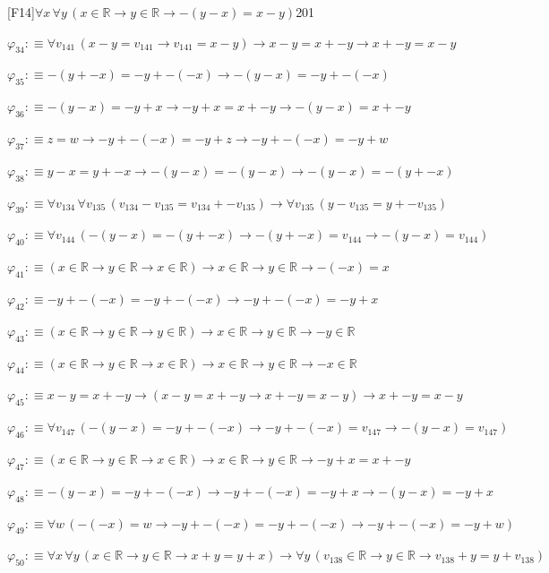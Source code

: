 \begin{fullproof}{[F14]}{$\forall x\,\forall y\,(x \in \mathbb{R} \to y \in \mathbb{R} \to -(y - x) = x - y)$}{201}
\begin{abbrevlist}
\item $\varphi_{34} :\equiv \forall v_{141}\,(x - y = v_{141} \to v_{141} = x - y) \to x - y = x + -y \to x + -y = x - y$
\item $\varphi_{35} :\equiv -(y + -x) = -y + -(-x) \to -(y - x) = -y + -(-x)$
\item $\varphi_{36} :\equiv -(y - x) = -y + x \to -y + x = x + -y \to -(y - x) = x + -y$
\item $\varphi_{37} :\equiv z = w \to -y + -(-x) = -y + z \to -y + -(-x) = -y + w$
\item $\varphi_{38} :\equiv y - x = y + -x \to -(y - x) = -(y - x) \to -(y - x) = -(y + -x)$
\item $\varphi_{39} :\equiv \forall v_{134}\,\forall v_{135}\,(v_{134} - v_{135} = v_{134} + -v_{135}) \to \forall v_{135}\,(y - v_{135} = y + -v_{135})$
\item $\varphi_{40} :\equiv \forall v_{144}\,(-(y - x) = -(y + -x) \to -(y + -x) = v_{144} \to -(y - x) = v_{144})$
\item $\varphi_{41} :\equiv (x \in \mathbb{R} \to y \in \mathbb{R} \to x \in \mathbb{R}) \to x \in \mathbb{R} \to y \in \mathbb{R} \to -(-x) = x$
\item $\varphi_{42} :\equiv -y + -(-x) = -y + -(-x) \to -y + -(-x) = -y + x$
\item $\varphi_{43} :\equiv (x \in \mathbb{R} \to y \in \mathbb{R} \to y \in \mathbb{R}) \to x \in \mathbb{R} \to y \in \mathbb{R} \to -y \in \mathbb{R}$
\item $\varphi_{44} :\equiv (x \in \mathbb{R} \to y \in \mathbb{R} \to x \in \mathbb{R}) \to x \in \mathbb{R} \to y \in \mathbb{R} \to -x \in \mathbb{R}$
\item $\varphi_{45} :\equiv x - y = x + -y \to (x - y = x + -y \to x + -y = x - y) \to x + -y = x - y$
\item $\varphi_{46} :\equiv \forall v_{147}\,(-(y - x) = -y + -(-x) \to -y + -(-x) = v_{147} \to -(y - x) = v_{147})$
\item $\varphi_{47} :\equiv (x \in \mathbb{R} \to y \in \mathbb{R} \to x \in \mathbb{R}) \to x \in \mathbb{R} \to y \in \mathbb{R} \to -y + x = x + -y$
\item $\varphi_{48} :\equiv -(y - x) = -y + -(-x) \to -y + -(-x) = -y + x \to -(y - x) = -y + x$
\item $\varphi_{49} :\equiv \forall w\,(-(-x) = w \to -y + -(-x) = -y + -(-x) \to -y + -(-x) = -y + w)$
\item $\varphi_{50} :\equiv \forall x\,\forall y\,(x \in \mathbb{R} \to y \in \mathbb{R} \to x + y = y + x) \to \forall y\,(v_{138} \in \mathbb{R} \to y \in \mathbb{R} \to v_{138} + y = y + v_{138})$

\end{abbrevlist}
\end{fullproof}
